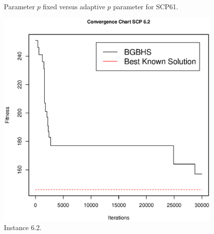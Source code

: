 \begin{figure}[htp] 
    \centering
    \hfill%
        \caption{Parameter $p$ fixed versus adaptive $p$ parameter for SCP61.}
\end{figure}

\begin{figure}[]
\centering
\includegraphics[scale=.45]{Resultados/scp62.eps}
\caption{Instance 6.2.}
\label{fig:Instance.6.2}
\end{figure}

